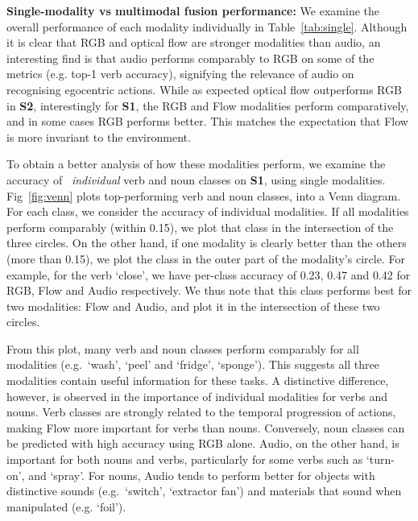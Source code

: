 \documentclass[10pt,twocolumn,letterpaper]{article}
\begin{document}
\begin{table*}[t]
\begin{center}
{\begin{tabular}{ll|ccc|ccc|ccc|ccc}
\end{tabular}}
\caption{Comparison of our fusion method to single modality performance. For both splits, the fusion outperforms single modalities. For the seen split, the RGB and Flow modalities perform comparatively, whereas for the unseen split the Flow modality outperforms RGB by a large margin. Audio is comparable to RGB on top-1 verb accuracy for both splits.} 
\label{tab:single}
\end{center}
\end{table*} 
\noindent\textbf{Single-modality vs multimodal fusion performance: }We examine the overall performance of each modality individually in Table~\ref{tab:single}. Although it is clear that RGB and optical flow are stronger modalities than audio, an interesting find is that
audio performs comparably to RGB on some of the metrics (e.g. top-1 verb accuracy), signifying 
the relevance of audio on recognising egocentric actions. While
as expected optical flow outperforms RGB in \textbf{S2}, interestingly for \textbf{S1}, the RGB and Flow modalities perform comparatively, and in some cases
RGB performs better. 
This matches the expectation that Flow is more invariant to the environment.


To obtain a better analysis of how these modalities perform, we examine the accuracy of ~\textit{individual} verb and noun classes on \textbf{S1}, using single modalities.
Fig~\ref{fig:venn} plots top-performing verb and noun classes, into a Venn diagram. For each class, we consider the accuracy of individual modalities. If all modalities perform comparably (within 0.15), we plot that class in the intersection of the three circles. On the other hand, if one modality is clearly better than the others (more than 0.15), we plot the class in the outer part of the modality's circle. For example, for the verb `close', we have per-class accuracy of 0.23, 0.47 and 0.42 for RGB, Flow and Audio respectively. We thus note that this class performs best for two modalities: Flow and Audio, and plot it in the intersection of these two circles. 




From this plot, many verb and noun classes perform comparably for all modalities (e.g.\ `wash', `peel' and `fridge', `sponge'). This suggests all three modalities contain useful information for these tasks. A distinctive difference, however, is observed in the importance of individual modalities for verbs and nouns. Verb classes are strongly related to the temporal progression of actions, making Flow more important for verbs than nouns. Conversely, noun classes can be predicted with high accuracy using RGB alone. Audio, on the other hand, is important for both nouns and verbs, particularly for some verbs such as `turn-on', and `spray'. For nouns, Audio tends to perform better for objects with distinctive sounds (e.g.\ `switch', `extractor fan') and materials that sound when manipulated (e.g. `foil').
\end{document}
